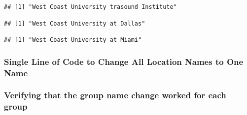 \documentclass[
]{article}
\newenvironment{Shaded}{\begin{snugshade}}{\end{snugshade}}
\newcommand{\DecValTok}[1]{\textcolor[rgb]{0.00,0.00,0.81}{#1}}
\newcommand{\KeywordTok}[1]{\textcolor[rgb]{0.13,0.29,0.53}{\textbf{#1}}}
\newcommand{\NormalTok}[1]{#1}
\newcommand{\OperatorTok}[1]{\textcolor[rgb]{0.81,0.36,0.00}{\textbf{#1}}}
\newcommand{\StringTok}[1]{\textcolor[rgb]{0.31,0.60,0.02}{#1}}
\begin{document}
\begin{Shaded}
\end{Shaded}

\begin{verbatim}
## [1] "West Coast University trasound Institute"
\end{verbatim}

\begin{Shaded}
\end{Shaded}

\begin{verbatim}
## [1] "West Coast University at Dallas"
\end{verbatim}

\begin{Shaded}
\end{Shaded}

\begin{verbatim}
## [1] "West Coast University at Miami"
\end{verbatim}

\hypertarget{single-line-of-code-to-change-all-location-names-to-one-name}{%
\subsubsection{Single Line of Code to Change All Location Names to One
Name}\label{single-line-of-code-to-change-all-location-names-to-one-name}}

\begin{Shaded}
\end{Shaded}

\hypertarget{verifying-that-the-group-name-change-worked-for-each-group}{%
\subsubsection{Verifying that the group name change worked for each
group}\label{verifying-that-the-group-name-change-worked-for-each-group}}
\end{document}
